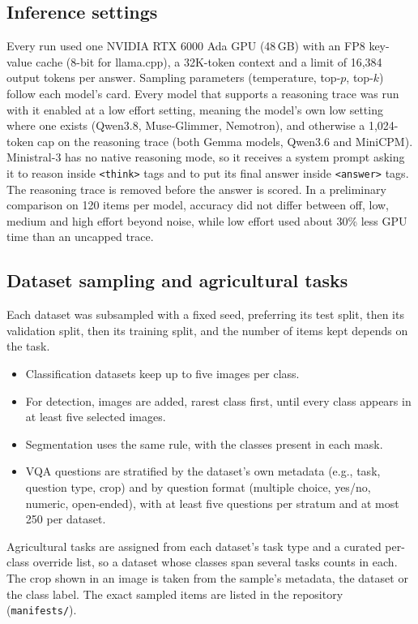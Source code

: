 \documentclass[10pt,letterpaper]{article}
\newcommand{\code}[1]{\texttt{#1}}
\begin{document}
\subsection{Inference settings}
\label{app:inference}
Every run used one NVIDIA RTX 6000 Ada GPU (48\,GB) with an FP8 key-value cache (8-bit for llama.cpp), a 32K-token context and a limit of 16,384 output tokens per answer. Sampling parameters (temperature, top-$p$, top-$k$) follow each model's card. Every model that supports a reasoning trace was run with it enabled at a low effort setting, meaning the model's own low setting where one exists (Qwen3.8, Muse-Glimmer, Nemotron), and otherwise a 1,024-token cap on the reasoning trace (both Gemma models, Qwen3.6 and MiniCPM). Ministral-3 has no native reasoning mode, so it receives a system prompt asking it to reason inside \code{<think>} tags and to put its final answer inside \code{<answer>} tags. The reasoning trace is removed before the answer is scored. In a preliminary comparison on 120 items per model, accuracy did not differ between off, low, medium and high effort beyond noise, while low effort used about 30\% less GPU time than an uncapped trace.

\subsection{Dataset sampling and agricultural tasks}
\label{app:sampling}
Each dataset was subsampled with a fixed seed, preferring its test split, then its validation split, then its training split, and the number of items kept depends on the task.
\begin{itemize}
    \item Classification datasets keep up to five images per class.
    \item For detection, images are added, rarest class first, until every class appears in at least five selected images.
    \item Segmentation uses the same rule, with the classes present in each mask.
    \item VQA questions are stratified by the dataset's own metadata (e.g., task, question type, crop) and by question format (multiple choice, yes/no, numeric, open-ended), with at least five questions per stratum and at most 250 per dataset.
\end{itemize}
Agricultural tasks are assigned from each dataset's task type and a curated per-class override list, so a dataset whose classes span several tasks counts in each. The crop shown in an image is taken from the sample's metadata, the dataset or the class label. The exact sampled items are listed in the repository (\code{manifests/}).
\end{document}

